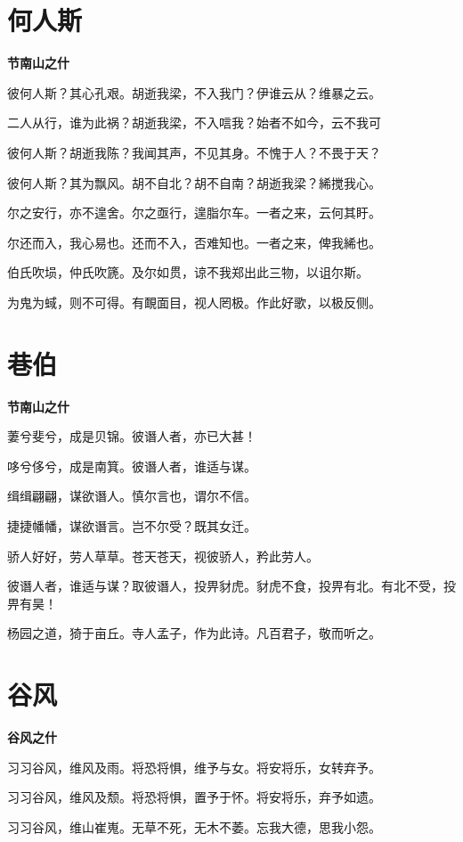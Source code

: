 \documentclass[12pt,a4paper]{ctexbook}
\begin{document}
\section{何人斯}
\textbf{节南山之什}\par\vspace{0.5em}
彼何人斯？其心孔艰。胡逝我梁，不入我门？伊谁云从？维暴之云。\par
二人从行，谁为此祸？胡逝我梁，不入唁我？始者不如今，云不我可\par
彼何人斯？胡逝我陈？我闻其声，不见其身。不愧于人？不畏于天？\par
彼何人斯？其为飘风。胡不自北？胡不自南？胡逝我梁？絺搅我心。\par
尔之安行，亦不遑舍。尔之亟行，遑脂尔车。一者之来，云何其盱。\par
尔还而入，我心易也。还而不入，否难知也。一者之来，俾我絺也。\par
伯氏吹埙，仲氏吹篪。及尔如贯，谅不我郑出此三物，以诅尔斯。\par
为鬼为蜮，则不可得。有靦面目，视人罔极。作此好歌，以极反侧。\par

\section{巷伯}
\textbf{节南山之什}\par\vspace{0.5em}
萋兮斐兮，成是贝锦。彼谮人者，亦已大甚！\par
哆兮侈兮，成是南箕。彼谮人者，谁适与谋。\par
缉缉翩翩，谋欲谮人。慎尔言也，谓尔不信。\par
捷捷幡幡，谋欲谮言。岂不尔受？既其女迁。\par
骄人好好，劳人草草。苍天苍天，视彼骄人，矜此劳人。\par
彼谮人者，谁适与谋？取彼谮人，投畀豺虎。豺虎不食，投畀有北。有北不受，投畀有昊！\par
杨园之道，猗于亩丘。寺人孟子，作为此诗。凡百君子，敬而听之。\par

\section{谷风}
\textbf{谷风之什}\par\vspace{0.5em}
习习谷风，维风及雨。将恐将惧，维予与女。将安将乐，女转弃予。\par
习习谷风，维风及颓。将恐将惧，置予于怀。将安将乐，弃予如遗。\par
习习谷风，维山崔嵬。无草不死，无木不萎。忘我大德，思我小怨。\par
\end{document}
